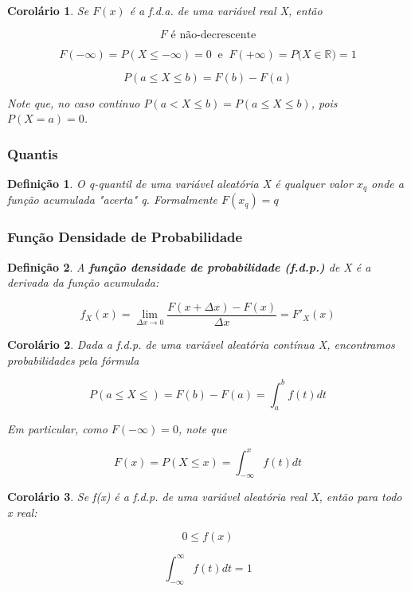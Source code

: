 \documentclass[12pt]{article}
\newtheorem{corollary}{Corolário}[theorem]
\newtheorem{definition}{Definição}
\begin{document}
\begin{corollary}
    Se $F(x)$ é a f.d.a. de uma variável real X, então
    
    $$F \text{ é não-decrescente}$$
    
    $$F(- \infty) = P(X \leq - \infty) = 0 \ \text{ e } \ F(+\infty) = P(X \in \mathbb{R)} = 1$$
    
    $$P(a \leq X \leq b) = F(b) - F(a)$$
    
    Note que, no caso continuo $P(a < X \leq b) = P(a \leq X \leq b)$, pois $P(X = a) = 0$.
\end{corollary}

\subsubsection*{Quantis}

\begin{definition}
    O q-quantil de uma variável aleatória X é qualquer valor $x_q$ onde a função acumulada "acerta" q. Formalmente $F(x_q) = q$
\end{definition}

\subsubsection*{Função Densidade de Probabilidade}

\begin{definition}
    A \textbf{função densidade de probabilidade (f.d.p.)} de X é a derivada da função acumulada:
    
    $$f_X(x) = \lim_{\Delta x \rightarrow{} 0} \dfrac{F(x + \Delta x) - F(x)}{\Delta x} = F'_X (x)$$
\end{definition}

\begin{corollary}
    Dada a f.d.p. de uma variável aleatória contínua X, encontramos probabilidades pela fórmula
    
    $$P(a \leq X \leq) = F(b) - F(a) = \int_a^b f(t) d t$$
    
    Em particular, como $F(- \infty) = 0$, note que
    
    $$F(x) = P(X \leq x) = \int_{-\infty}^x f(t) d t$$
\end{corollary}

\begin{corollary}
    Se f(x) é a f.d.p. de uma variável aleatória real X, então para todo x real:
    
    $$0 \leq f(x)$$
    
    $$\int_{- \infty}^{\infty} f(t) d t = 1$$
\end{corollary}
\end{document}
